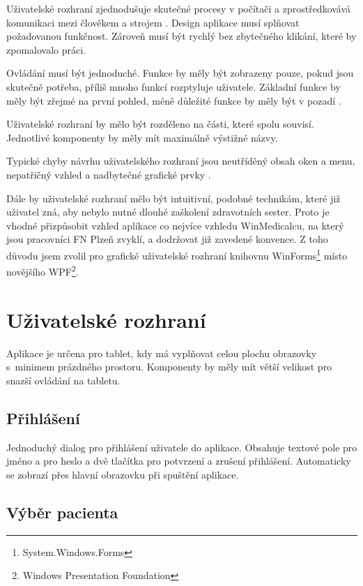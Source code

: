 Uživatelské rozhraní zjednodušuje skutečné procesy v počítači a zprostředkovává komunikaci mezi člověkem a strojem \cite{helander}. Design aplikace musí splňovat požadovanou funkčnost. Zároveň musí být rychlý bez zbytečného klikání, které by zpomalovalo práci.

Ovládání musí být jednoduché. Funkce by měly být zobrazeny pouze, pokud jsou skutečně potřeba, příliš mnoho funkcí rozptyluje uživatele. Základní funkce by měly být zřejmé na první pohled, méně důležité funkce by měly být v pozadí \cite{saffer}. 

Uživatelské rozhraní by mělo být rozděleno na části, které spolu souvisí. Jednotlivé komponenty by měly mít maximálně výstižné názvy.

Typické chyby návrhu uživatelského rozhraní jsou neutříděný obsah oken a menu, nepatřičný vzhled a nadbytečné grafické prvky \cite{sojka}.

Dále by uživatelské rozhraní mělo být intuitivní, podobné technikám, které již uživatel zná, aby nebylo nutné dlouhé zaškolení zdravotních sester. Proto je vhodné přizpůsobit vzhled aplikace co nejvíce vzhledu WinMedicalcu, na který jsou pracovníci FN Plzeň zvyklí, a dodržovat již zavedené konvence. Z toho důvodu jsem zvolil pro grafické uživatelské rozhraní knihovnu WinForms\footnote{System.Windows.Forms} místo novějšího WPF\footnote{Windows Presentation Foundation}.


\section{Uživatelské rozhraní}

Aplikace je určena pro tablet, kdy má vyplňovat celou plochu obrazovky s~minimem prázdného prostoru. Komponenty by měly mít větší velikost pro snazší ovládání na tabletu.

\subsection{Přihlášení}

Jednoduchý dialog pro přihlášení uživatele do aplikace. Obsahuje textové pole pro jméno a pro heslo a dvě tlačítka pro potvrzení a zrušení přihlášení. Automaticky se zobrazí přes hlavní obrazovku při spuštění aplikace.

\subsection{Výběr pacienta}

